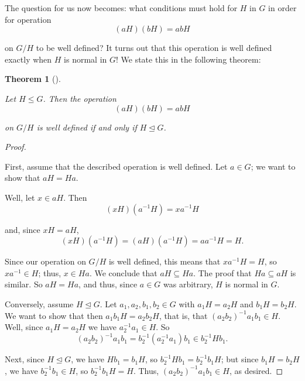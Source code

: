 \documentclass[10pt,]{book}
\theoremstyle{plain}
\newtheorem{theorem}{Theorem}[section]
\theoremstyle{definition}
\theoremstyle{definition}
\theoremstyle{definition}
\theoremstyle{definition}
\numberwithin{equation}{section}
\begin{document}
    The question for us now becomes: what conditions must hold
    for \(H\) in \(G\) in order for operation
\begin{equation*}

      (aH)(bH)=abH
    
\end{equation*}

    on \(G/H\)
    to be well defined? It turns out that this operation is well
    defined exactly when \(H\) is normal in \(G\)! We state this in the
    following theorem:
\begin{theorem}[{}]\label{cmwd}

        Let \(H\leq G\). Then the operation
\begin{equation*}

          (aH)(bH)=abH
        
\end{equation*}

        on
        \(G/H\) is well defined if and only if \(H \unlhd G\).
\end{theorem}
\begin{proof}\hypertarget{proof-41}{}

      First, assume that the described operation is well defined. Let \(a\in G\); we want to show that \(aH=Ha\).%
\par
Well, let \(x\in aH\). Then
\begin{equation*}

        (xH)(a^{-1}H)=xa^{-1}H
      
\end{equation*}

      and, since
      \(xH=aH\),
\begin{equation*}

        (xH)(a^{-1}H)=(aH)(a^{-1}H)=aa^{-1}H=H.
      
\end{equation*}

      Since our operation on \(G/H\) is well defined, this means that
      \(xa^{-1}H=H\), so \(xa^{-1}\in H\); thus, \(x\in Ha\). We conclude that
      \(aH\subseteq Ha\). The proof that \(Ha\subseteq aH\) is similar. So \(aH=Ha\), and thus, since \(a\in G\) was arbitrary, 
      \(H\) is normal in \(G\).
\par
 Conversely, assume \(H\unlhd  G\).
      Let \(a_1,a_2,b_1,b_2\in G\) with \(a_1H=a_2H\) and
      \(b_1H=b_2H\). We want to show that then \(a_1b_1H=a_2b_2H\), that is,
      that \((a_2b_2)^{-1}a_1b_1\in H\). Well, since \(a_1H=a_2H\) we have
      \(a_2^{-1}a_1\in H\). So
\begin{equation*}

        (a_2b_2)^{-1}a_1b_1=b_2^{-1}(a_2^{-1}a_1)b_1 \in b_2^{-1}Hb_1.
      
\end{equation*}

\par

      Next, since \(H\unlhd G\),
      we have \(Hb_1=b_1H\), so \(b_2^{-1}Hb_1=b_2^{-1}b_1H\); but since
      \(b_1H=b_2H\), we have \(b_2^{-1}b_1\in H\), so \(b_2^{-1}b_1H=H\). Thus,
      \((a_2b_2)^{-1}a_1b_1\in H\), as desired.
\end{proof}
\end{document}
